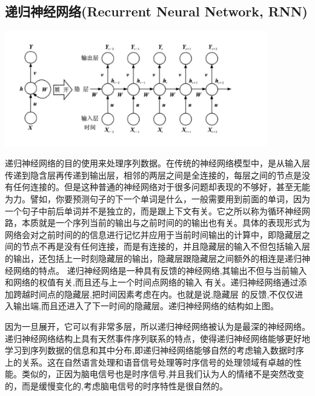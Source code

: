 \subsection{递归神经网络(Recurrent Neural Network, RNN)}{
	\centerline{\includegraphics[width=4.5in]{figure/rnn.png}}
	递归神经网络的目的使用来处理序列数据。在传统的神经网络模型中，是从输入层传递到隐含层再传递到输出层，相邻的两层之间是全连接的，每层之间的节点是没有任何连接的。但是这种普通的神经网络对于很多问题却表现的不够好，甚至无能为力。譬如，你要预测句子的下一个单词是什么，一般需要用到前面的单词，因为一个句子中前后单词并不是独立的，而是跟上下文有关。它之所以称为循环神经网路，本质就是一个序列当前的输出与之前时间的的输出也有关。具体的表现形式为网络会对之前时间的的信息进行记忆并应用于当前时间输出的计算中，即隐藏层之间的节点不再是没有任何连接，而是有连接的，并且隐藏层的输入不但包括输入层的输出，还包括上一时刻隐藏层的输出，隐藏层跟隐藏层之间额外的相连是递归神经网络的特点。
	递归神经网络是一种具有反馈的神经网络,其输出不但与当前输入和网络的权值有关,而且还与上一个时间点网络的输入 有关。递归神经网络通过添加跨越时间点的隐藏层,把时间因素考虑在内。也就是说,隐藏层 的反馈,不仅仅进入输出端,而且还进入了下一时间的隐藏层。递归神经网络的结构如上图。
	
	因为一旦展开，它可以有非常多层，所以递归神经网络被认为是最深的神经网络。递归神经网络结构上具有天然事件序列联系的特点，使得递归神经网络能够更好地学习到序列数据的信息和其中分布,即递归神经网络能够自然的考虑输入数据时序上的关系。这在自然语言处理和语音信号处理等时序信号的处理领域有卓越的性能。类似的，正因为脑电信号也是时序信号,并且我们认为人的情绪不是突然改变的，而是缓慢变化的,考虑脑电信号的时序特性是很自然的。}

